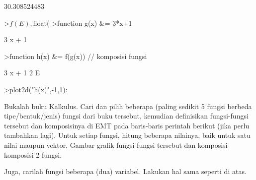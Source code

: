 \documentclass[a4paper,10pt]{article}
\begin{document}
\begin{eulernotebook}
\begin{eulercomment}
\begin{eulercomment}
\begin{eulercomment}
\begin{eulercomment}
\begin{eulercomment}
\begin{eulercomment}
\begin{eulercomment}
\begin{eulercomment}
\begin{eulercomment}
\begin{eulercomment}
\begin{eulercomment}
\begin{eulercomment}
\begin{eulercomment}
\begin{eulercomment}
\begin{eulercomment}
\begin{eulercomment}
\begin{eulercomment}
\begin{eulercomment}
\begin{euleroutput}
\end{euleroutput}
\begin{euleroutput}
  30.308524483
\end{euleroutput}
\begin{eulerprompt}
>$f(E), $float(%
>function g(x) &= 3*x+1
\end{eulerprompt}
\begin{euleroutput}
  
                                 3 x + 1
  
\end{euleroutput}
\begin{eulerprompt}
>function h(x) &= f(g(x)) // komposisi fungsi
\end{eulerprompt}
\begin{euleroutput}
  
                                   3 x + 1
                                2 E
  
\end{euleroutput}
\begin{eulerprompt}
>plot2d("h(x)",-1,1):
\end{eulerprompt}
\begin{eulercomment}
Bukalah buku Kalkulus. Cari dan pilih beberapa (paling sedikit 5
fungsi berbeda tipe/bentuk/jenis) fungsi dari buku tersebut, kemudian
definisikan fungsi-fungsi tersebut dan komposisinya di EMT pada
baris-baris perintah berikut (jika perlu tambahkan lagi). Untuk setiap
fungsi, hitung beberapa nilainya, baik untuk satu nilai maupun vektor.
Gambar grafik fungsi-fungsi tersebut dan komposisi-komposisi 2 fungsi.

Juga, carilah fungsi beberapa (dua) variabel. Lakukan hal sama seperti
di atas.



\end{eulercomment}
\end{eulercomment}
\end{eulercomment}
\end{eulercomment}
\end{eulercomment}
\end{eulercomment}
\end{eulercomment}
\end{eulercomment}
\end{eulercomment}
\end{eulercomment}
\end{eulercomment}
\end{eulercomment}
\end{eulercomment}
\end{eulercomment}
\end{eulercomment}
\end{eulercomment}
\end{eulercomment}
\end{eulercomment}
\end{eulercomment}
\end{eulernotebook}
\end{document}
